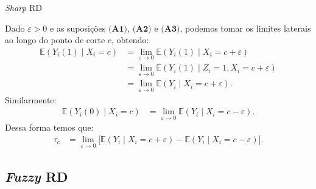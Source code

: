 \documentclass[aspectratio=1610, 10pt]{beamer}
\begin{document}
\begin{frame}{\textit{Sharp} RD}

    Dado $\varepsilon>0$ e as suposições $\textbf{(A1)}$, $\textbf{(A2)}$ e $\textbf{(A3)}$, podemos tomar os limites laterais ao longo do ponto de corte $c$, obtendo:
    \begin{align*}
        \mathbb{E}(Y_i(1) \mid X_i = c) &= \lim_{\varepsilon \rightarrow 0} \mathbb{E}(Y_i(1) \mid X_i = c + \varepsilon) \\
        &= \lim_{\varepsilon \rightarrow 0} \mathbb{E}(Y_i(1) \mid Z_i=1, X_i = c + \varepsilon) \\
        &= \lim_{\varepsilon \rightarrow 0} \mathbb{E}(Y_i \mid X_i = c + \varepsilon).
    \end{align*}
    Similarmente:
    \begin{align*}
        \mathbb{E}(Y_i(0) \mid X_i = c) &= \lim_{\varepsilon \rightarrow 0} \mathbb{E}(Y_i \mid X_i = c - \varepsilon).
    \end{align*}
    Dessa forma temos que:
    \begin{align*}
        \tau_c &=  \lim_{\varepsilon \rightarrow 0} \big[ \mathbb{E}(Y_i \mid X_i = c + \varepsilon) - \mathbb{E}(Y_i \mid X_i = c - \varepsilon) \big].
    \end{align*}
\end{frame}


\subsection{\textit{Fuzzy} RD}
\end{document}
